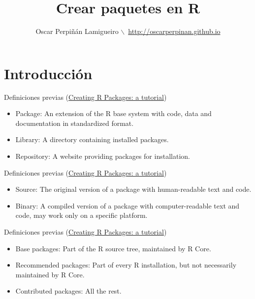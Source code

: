 \documentclass[xcolor={usenames,svgnames,dvipsnames}]{beamer}
\author{Oscar Perpiñán Lamigueiro $\backslash$\ \url{http://oscarperpinan.github.io}}
\date{}
\title{Crear paquetes en R}
\begin{document}
\maketitle


\section{Introducción}
\label{sec:org67da5d8}

\begin{frame}[label={sec:orgc5f6701}]{Definiciones previas (\href{http://cran.r-project.org/doc/contrib/Leisch-CreatingPackages.pdf}{Creating R Packages: a tutorial})}
\begin{itemize}
\item \alert{Package}: An extension of the R base system with code, data and
documentation in standardized format.
\item \alert{Library}: A directory containing installed packages.
\item \alert{Repository}: A website providing packages for installation.
\end{itemize}
\end{frame}

\begin{frame}[label={sec:org871ba39}]{Definiciones previas (\href{http://cran.r-project.org/doc/contrib/Leisch-CreatingPackages.pdf}{Creating R Packages: a tutorial})}
\begin{itemize}
\item \alert{Source}: The original version of a package with human-readable text and code.
\item \alert{Binary}: A compiled version of a package with computer-readable
text and code, may work only on a specific platform.
\end{itemize}
\end{frame}

\begin{frame}[label={sec:org0c2f227}]{Definiciones previas (\href{http://cran.r-project.org/doc/contrib/Leisch-CreatingPackages.pdf}{Creating R Packages: a tutorial})}
\begin{itemize}
\item \alert{Base packages}: Part of the R source tree, maintained by R Core.
\item \alert{Recommended packages}: Part of every R installation, but not
necessarily maintained by R Core.
\item \alert{Contributed packages}: All the rest.
\end{itemize}
\end{frame}
\end{document}
